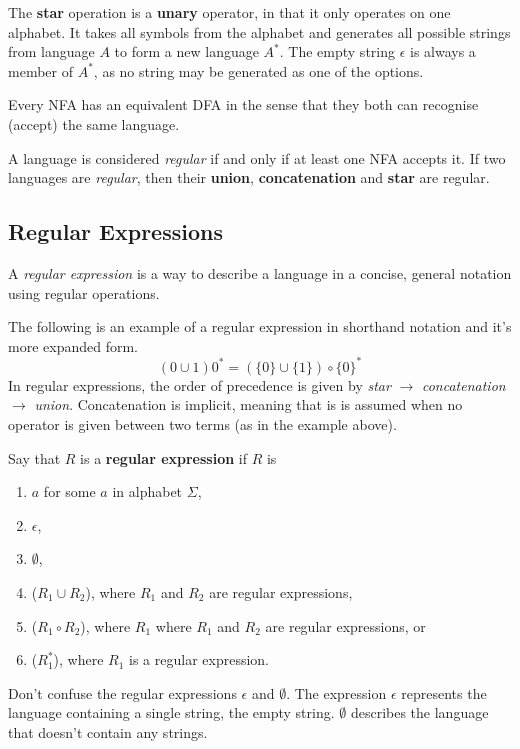 The \textbf{star} operation is a \textbf{unary} operator, in that it only operates on one alphabet. It takes all symbols from the alphabet and generates all possible  strings from language \( A \)  to form a new language \( A^* \). The empty string \( \epsilon \) is always a member of \( A^* \), as no string may be generated as one of the options.

Every NFA has an equivalent DFA in the sense that they both can recognise (accept) the same language.

A language is considered \emph{regular} if and only if at least one NFA accepts it. If two languages are \emph{regular}, then their \textbf{union}, \textbf{concatenation} and \textbf{star} are regular.

\subsection{Regular Expressions}

A \emph{regular expression} is a way to describe a language in a concise, general notation using regular operations.

The following is an example of a regular expression in shorthand notation and it's more expanded form.
 \[
(0 \cup 1)0^* = (\{0\} \cup \{1\})\circ \{0\}^*	
\]
In regular expressions, the order of precedence is given by \emph{star} \( \rightarrow \) \emph{concatenation} \( \rightarrow \) \emph{union}. Concatenation is implicit, meaning that is is assumed when no operator is given between two terms (as in the example above).

Say that \( R \) is a \textbf{regular expression} if \( R \) is

\begin{enumerate}
	\item \( a \) for some \( a \) in alphabet \( \Sigma \),
	\item \( \epsilon \),
	\item \( \emptyset \),
	\item (\( R_1 \cup R_2 \)), where \( R_1 \) and \( R_2 \) are regular expressions,
	\item (\( R_1 \circ R_2 \)), where \( R_1 \) where \( R_1 \) and \( R_2 \) are regular expressions, or
	\item (\( R_1^* \)), where \( R_1 \) is a regular expression.
\end{enumerate}

Don't confuse the regular expressions \( \epsilon \)  and \( \emptyset \). The expression \( \epsilon \)  represents the language containing a single string, the empty string. \( \emptyset \) describes the language that doesn't contain any strings.

